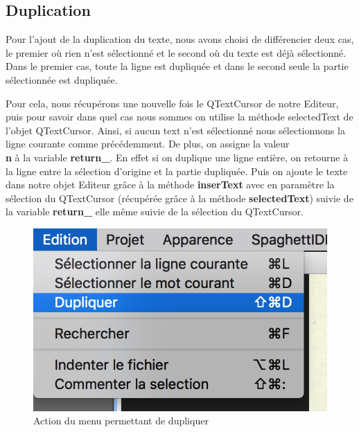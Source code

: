 \documentclass[a4paper,12pt]{article}
\begin{document}

	\subsection{Duplication}

	Pour l'ajout de la duplication du texte, nous avons choisi de différencier deux cas, le premier où rien n'est sélectionné et le second où du texte est déjà sélectionné. Dans le premier cas, toute la ligne est dupliquée et dans le second seule la partie sélectionnée est dupliquée.

	Pour cela, nous récupérons une nouvelle fois le QTextCursor de notre Editeur, puis pour savoir dans quel cas nous sommes on utilise la méthode selectedText de l'objet QTextCursor. Ainsi, si aucun text n'est sélectionné nous sélectionnons la ligne courante comme précédemment. De plus, on assigne la valeur  \textbf{\\n} à la variable \textbf{return\_}. En effet si on duplique une ligne entière, on retourne à la ligne entre la sélection d'origine et la partie dupliquée. Puis on ajoute le texte dans notre objet Editeur grâce à la méthode \textbf{inserText} avec en paramètre la sélection du QTextCursor (récupérée grâce à la méthode \textbf{selectedText}) suivie de la variable \textbf{return\_} elle même suivie de la sélection du QTextCursor.

	\begin{figure}[h!]
		\begin{center}
			\includegraphics[scale=0.8]{images/imgs_edit/utilisation_duplication}
			\caption{Action du menu permettant de dupliquer}
		\end{center}
	\end{figure}
\end{document}

